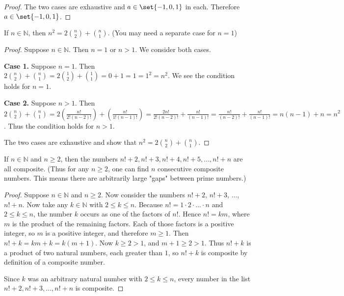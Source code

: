 \documentclass[DIN, pagenumber=false, fontsize=11pt, parskip=half]{scrartcl}
\begin{document}
\begin{problems}
\begin{proof}
        The two cases are exhaustive and $a \in \set{-1,0,1}$ in each. Therefore $a \in \set{-1,0,1}$.
    \end{proof}

    \problem If $n \in \mathbb{N}$, then $n^2 = 2{n \choose 2} + {n \choose 1}$. 
    (You may need a separate case for $n = 1$)
    \begin{proof}
        Suppose $n \in \mathbb{N}$. Then $n = 1$ or $n > 1$. We consider both cases.

        \textbf{Case 1.} Suppose $n = 1$. 
        Then $2{n \choose 2} + {n \choose 1} = 2{1 \choose 2} + {1 \choose 1} = 0 + 1 = 1 = 1^2 = n^2$.
        We see the condition holds for $n = 1$.

        \textbf{Case 2.} Suppose $n > 1$.
        Then $2{n \choose 2} + {n \choose 1} = 2\left(\frac{n!}{2!(n-2)!}\right) + \left(\frac{n!}{1!(n-1)!}\right) = \frac{2n!}{2!(n-2)!} + \frac{n!}{(n-1)!} = \frac{n!}{(n-2)!} + \frac{n!}{(n-1)!} = n(n-1) + n = n^2$.
        Thus the condition holds for $n > 1$.

        The two cases are exhaustive and show that $n^2 = 2{n \choose 2} + {n \choose 1}$.
    \end{proof}

    \problem If $n \in \mathbb{N}$ and $n \geq 2$, then the numbers $n! + 2, n! +3, n! + 4, n! + 5, ... , n! + n$ are all composite. 
    (Thus for any $n \geq 2$, one can find $n$ consecutive composite numbers. 
    This means there are arbitrarily large "gaps" between prime numbers.)
    \begin{proof}
        Suppose $n \in \mathbb{N}$ and $n \geq 2$.
        Now consider the numbers $n! + 2$, $n! + 3$, ..., $n! + n$. 
        Now take any $k \in \mathbb{N}$ with $2 \leq k \leq n$.
        Because $n! = 1 \cdot 2 \cdot ... \cdot n$ and $2 \leq k \leq n$, the number $k$ occurs as one of the factors of $n!$.
        Hence $n! = km$, where $m$ is the product of the remaining factors.
        Each of those factors is a positive integer, so $m$ is a positive integer, and therefore $m \geq 1$.
        Then $n! + k = km + k = k(m+1)$.
        Now $k \geq 2 > 1$, and $m + 1 \geq 2 > 1$.
        Thus $n! + k$ is a product of two natural numbers, each greater than $1$, so $n! + k$ is composite by definition of a composite number.

        Since $k$ was an arbitrary natural number with $2 \leq k \leq n$, every number in the list $n! + 2, n! + 3, ..., n! + n$ is composite.
    \end{proof}

\end{problems}
\end{document}
